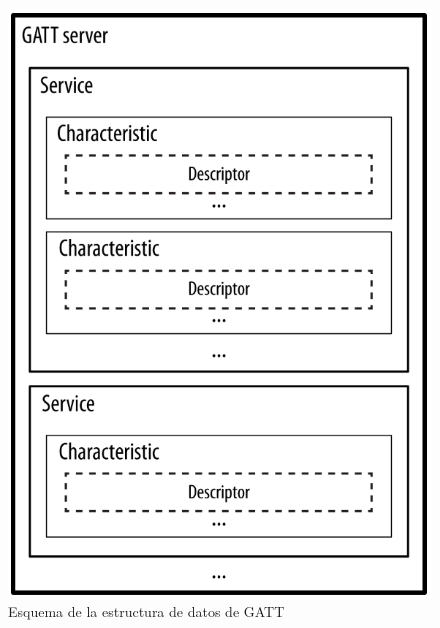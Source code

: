 \begin{figure}[h]%
	\centering
    \includegraphics[scale=0.5]{figures/ble_gatt_hierarchy.png} %
    \caption[Esquema de la estructura de datos de GATT]{Esquema de la estructura de datos de GATT}
   	\label{figuraBLEGATTHierarchy}
\end{figure}

